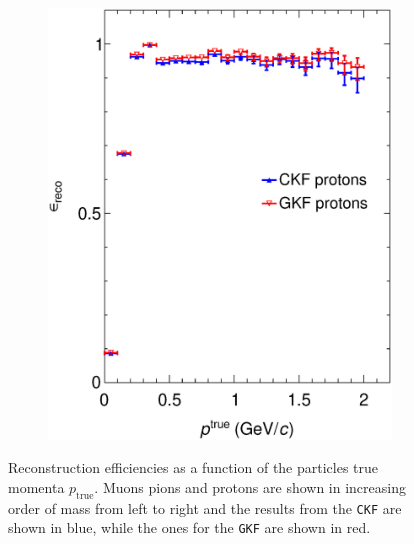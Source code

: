 \begin{figure}[t]
\begin{subfigure}{0.32\textwidth}
         \includegraphics[width=\textwidth]{figures/ch5-KF_NDGAr/FullSample/Integration/EffVSp2212.eps}
         \caption{}
         \label{fig:Eff2212_Integration}
     \end{subfigure}
        \caption[Reconstruction efficiencies as a function of the particles true momenta $p_\textrm{true}$.]{Reconstruction efficiencies as a function of the particles true momenta $p_\textrm{true}$. Muons pions and protons are shown in increasing order of mass from left to right and the results from the \texttt{CKF} are shown in blue, while the ones for the \texttt{GKF} are shown in red.}
        \label{fig:Eff_Integration}
\end{figure}

